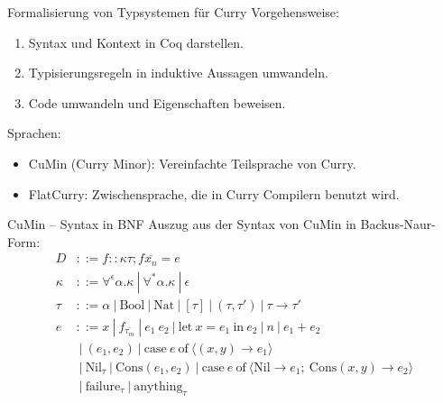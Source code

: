 \documentclass{beamer}
\begin{document}
\begin{frame}{Formalisierung von Typsystemen für Curry}
Vorgehensweise:
\begin{enumerate}
	\item Syntax und Kontext in Coq darstellen.
	\item Typisierungsregeln in induktive Aussagen umwandeln.
	\item Code umwandeln und Eigenschaften beweisen.
\end{enumerate}
Sprachen:
\begin{itemize}
	\item CuMin (Curry Minor): Vereinfachte Teilsprache von Curry.
	\item FlatCurry: Zwischensprache, die in Curry Compilern benutzt wird.
\end{itemize}
\end{frame}
\begin{frame}{CuMin -- Syntax in BNF}
Auszug aus der Syntax von CuMin in Backus-Naur-Form:
\begin{align*}
D &::= f :: \kappa \tau; f \overline{x_{n}} = e\\
\kappa &::= \forall^{\epsilon} \alpha.\kappa \:|\: \forall^{*}\alpha.\kappa \:|\: \epsilon \\
\tau &::= \alpha \:|\: \text{Bool} \:|\: \text{Nat} \:|\: [\tau] \:|\: (\tau,\tau ') \:|\: \tau \rightarrow \tau ' \\
e &::= x \:|\: f_{\overline{\tau_{m}}} \:|\: e_{1}\: e_{2} \:|\: \text{let}\: x = e_{1} \:\text{in}\: e_{2} \:|\: n \:|\: e_{1} + e_{2} \:\\
&\:|\: (e_{1},e_{2}) \:|\: \text{case}\: e \:\text{of}\: \langle (x,y) \rightarrow e_{1}\rangle\\
&\:|\: \text{Nil}_{\tau} \:|\: \text{Cons}(e_{1}, e_{2}) \:|\: \text{case}\: e \:\text{of}\: \langle \text{Nil} \rightarrow e_{1};\:\text{Cons}(x,y) \rightarrow e_{2}\rangle\\
&\:|\: \text{failure}_{\tau} \:|\: \text{anything}_{\tau}
\end{align*}
\end{frame}
\end{document}

